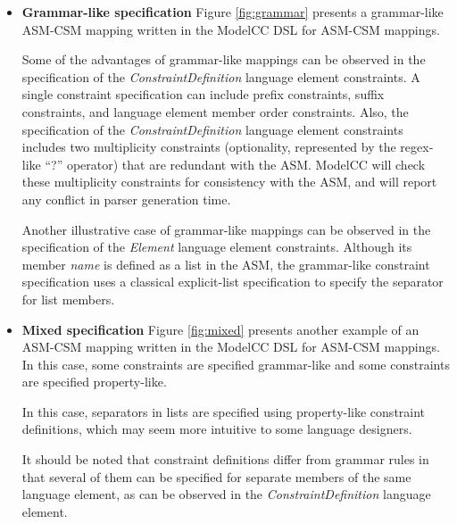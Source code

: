 \documentclass[floatfix,rmp,twocolumn,twoside]{revtex4}
\begin{document}
\begin{itemize}
\begin{figure*}[p]
\centering
\begin{varwidth}{0.99\linewidth}
\begin{verbatim}
ConstraintDefinition: "[" constraintID "]"
ConstraintDefinition: ":" constraint
Element.name[separator]: "."
Identifier.name: "[a-zA-Z][a-zA-Z0-9_]*"
ClausureSpecification: constraint "\*"
OptionalSpecification: constraint "\?"
PositiveClauseSpecification: constraint "\+"
ParenthesizedSpecification: ""
ConstraintSpecification: SequenceSpecification < PrecedenceSpecification
                         < AlternationSpecification 
AlternationSpecification.constraints[separator]: "\|"
PrecedenceSpecification.constraints[separator]: "\<"
Boolean.value: "true|false"
Integer.value: "[0-9]+"
\end{verbatim}
 \end{varwidth}
\caption{Mixed specification of the mapping from the abstract syntax model to the concrete syntax model of ModelCC DSL for ASM-CSM mappings, written in the ModelCC DSL for ASM-CSM mappings itself.}
\label{fig:mixed}
\end{figure*}
\item {\bf Grammar-like specification} Figure \ref{fig:grammar} presents a grammar-like ASM-CSM mapping written in the ModelCC DSL for ASM-CSM mappings.

Some of the advantages of grammar-like mappings can be observed in the specification of the \emph{ConstraintDefinition} language element constraints.
A single constraint specification can include prefix constraints, suffix constraints, and language element member order constraints.
Also, the specification of the \emph{ConstraintDefinition} language element constraints includes two multiplicity constraints (optionality, represented by the regex-like ``?'' operator) that are redundant with the ASM.
ModelCC will check these multiplicity constraints for consistency with the ASM, and will report any conflict in parser generation time.

Another illustrative case of grammar-like mappings can be observed in the specification of the \emph{Element} language element constraints.
Although its member \emph{name} is defined as a list in the ASM, the grammar-like constraint specification uses a classical explicit-list specification to specify the separator for list members.


\item {\bf Mixed specification} Figure \ref{fig:mixed} presents another example of an ASM-CSM mapping written in the ModelCC DSL for ASM-CSM mappings. In this case, some constraints are specified grammar-like and some constraints are specified property-like.

In this case, separators in lists are specified using property-like constraint definitions, which may seem more intuitive to some language designers.

It should be noted that constraint definitions differ from grammar rules in that several of them can be specified for separate members of the same language element, as can be observed in the \emph{ConstraintDefinition} language element.
\end{itemize}
\end{document}
